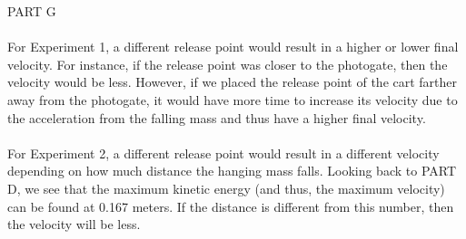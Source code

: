 \documentclass [12pt, letterpaper, twoside] {article}
\begin{document}
\noindent
PART G \\\\
For Experiment 1, a different release point would result in a higher or lower final velocity. For instance, if the release point was closer to the photogate, then the velocity would be less. However, if we placed the release point of the cart farther away from the photogate, it would have more time to increase its velocity due to the acceleration from the falling mass and thus have a higher final velocity. \\\\
For Experiment 2, a different release point would result in a different velocity depending on how much distance the hanging mass falls. Looking back to PART D, we see that the maximum kinetic energy (and thus, the maximum velocity) can be found at 0.167 meters. If the distance is different from this number, then the velocity will be less.
\end{document}
